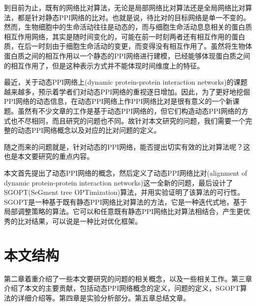 到目前为止，既有的网络比对算法，无论是局部网络比对算法还是全局网络比对算法，都是针对静态PPI网络的比对。也就是说，待比对的目标网络是单一不变的。然而，生物细胞中的生命活动往往是动态的，而与细胞生命活动息息相关的蛋白质相互作用网络，其实是随时间变化的，可能在前一时刻两者还有相互作用的蛋白质，在后一时刻由于细胞生命活动的变更，而变得没有相互作用了。虽然将生物体蛋白质之间的相互作用以一个静态的PPI网络进行建模，已经能够体现蛋白质之间的相互作用了，但是这种表示方式并不能体现时间维度上的特征。

最近，关于动态PPI网络上(dynamic protein-protein interaction networks)的课题越来越多，预示着学者们对动态PPI网络的重视逐日增加。因此，为了更好地挖倔PPI网络的动态信息，在动态PPI网络上作PPI网络比对是很有意义的一个新课题。虽然有不少文章的工作是基于动态PPI网络的\cite{lin2010dynamic,chen2014identifying,wang2013construction}，但它们构造动态PPI网络的方式也不尽相同，而且研究的问题也不同。故针对本文研究的问题，我们需要一个完整的动态PPI网络概念以及对应的比对问题的定义。

随之而来的问题就是，针对动态的PPI网络，能否提出切实有效的比对算法呢？这也是本文要研究的重点内容。

本文首先提出了动态PPI网络的概念，然后定义了动态PPI网络比对(alignment of dynamic protein-protein interaction networks)这一全新的问题，最后设计了SGOPT(SeGment tree OPTimization)算法，并用实验证明了该算法的可行性。SGOPT是一种基于既有静态PPI网络比对算法的方法，它是一种迭代式地，基于局部调整策略的算法。它可以和任意既有静态PPI网络比对算法相结合，产生更优秀的比对结果，可以说是一种比对优化框架。
\section{本文结构}

第二章着重介绍了一些本文要研究的问题的相关概念，以及一些相关工作。第三章介绍了本文的主要贡献，包括动态PPI网络概念的定义，问题的定义，SGOPT算法的详细介绍等。第四章是实验分析部分。第五章总结文章。
